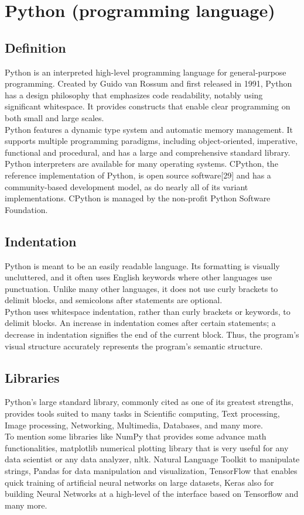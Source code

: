\section{Python (programming language)}
\label{chap:Python (programming language)}

\subsection{Definition}  
Python is an interpreted high-level programming language for general-purpose programming. Created by Guido van Rossum and first released in 1991, Python has a design philosophy that emphasizes code readability, notably using significant whitespace. It provides constructs that enable clear programming on both small and large scales.\\
Python features a dynamic type system and automatic memory management. It supports multiple programming paradigms, including object-oriented, imperative, functional and procedural, and has a large and comprehensive standard library.\\
Python interpreters are available for many operating systems. CPython, the reference implementation of Python, is open source software[29] and has a community-based development model, as do nearly all of its variant implementations. CPython is managed by the non-profit Python Software Foundation.\cite{web006}
\subsection{Indentation}
Python is meant to be an easily readable language. Its formatting is visually uncluttered, and it often uses English keywords where other languages use punctuation. Unlike many other languages, it does not use curly brackets to delimit blocks, and semicolons after statements are optional.\\
Python uses whitespace indentation, rather than curly brackets or keywords, to delimit blocks. An increase in indentation comes after certain statements; a decrease in indentation signifies the end of the current block. Thus, the program's visual structure accurately represents the program's semantic structure.
\subsection{Libraries}
Python's large standard library, commonly cited as one of its greatest strengths, provides tools suited to many tasks in Scientific computing, Text processing, Image processing, Networking, Multimedia, Databases, and many more.\\
To mention some libraries like NumPy that provides some advance math functionalities, matplotlib numerical plotting library that is very useful for any data scientist or any data analyzer, nltk. Natural Language Toolkit to manipulate strings, Pandas for data manipulation and visualization, TensorFlow that enables quick training of artificial neural networks on large datasets, Keras also for building Neural Networks at a high-level of the interface based on Tensorflow and many more.
